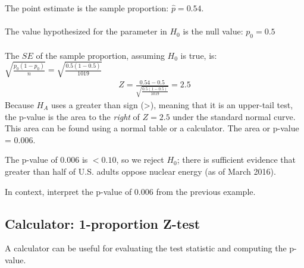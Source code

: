 \begin{examplewrap}
\begin{nexample}
\begin{description}
The point estimate is the sample proportion: $\hat{p} = 0.54.$\\
\\
The value hypothesized for the parameter in $H_0$ is the null value: $p_0 = 0.5$\\
\\
The $SE$ of the sample proportion, assuming $H_0$ is true, is: $\sqrt{\frac{p_0(1-p_0)}{n}}= \sqrt{\frac{0.5(1-0.5)}{1019}}$ \\
\begin{align*}
Z = \frac{0.54 - 0.5}{\sqrt{\frac{0.5(1-0.5)}{1019}}} = 2.5
\end{align*}
Because $H_A$ uses a greater than sign (>), meaning that it is an upper-tail test, the \mbox{p-value} is the area to the \emph{right} of $Z=2.5$ under the standard normal curve.  This area can be found using a normal table or a calculator.  The area or p-value = $0.006$.  
\item[\inferencestep{Conclude}]  The p-value of 0.006 is $< 0.10$, so we reject $H_0$; there is sufficient evidence that greater than half of U.S. adults oppose nuclear energy (as of March 2016).  
\end{description}
\end{nexample}
\end{examplewrap}



\begin{exercisewrap}
\begin{nexercise}
In context, interpret the p-value of 0.006 from the previous example.\footnotemark
\end{nexercise}
\end{exercisewrap}

\subsection{Calculator:  1-proportion Z-test}
A calculator can be useful for evaluating the test statistic and computing the p-value.  
\label{1propZtest}

